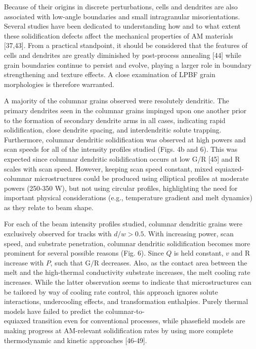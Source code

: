 \documentclass[10pt]{article}
\begin{document}
Because of their origins in discrete perturbations, cells and dendrites are also associated with low-angle boundaries and small intragranular misorientations. Several studies have been dedicated to understanding how and to what extent these solidification defects affect the mechanical properties of AM materials [37,43]. From a practical standpoint, it should be considered that the features of cells and dendrites are greatly diminished by post-process annealing [44] while grain boundaries continue to persist and evolve, playing a larger role in boundary strengthening and texture effects. A close examination of LPBF grain morphologies is therefore warranted.

A majority of the columnar grains observed were resolutely dendritic. The primary dendrites seen in the columnar grains impinged upon one another prior to the formation of secondary dendrite arms in all cases, indicating rapid solidification, close dendrite spacing, and interdendritic solute trapping. Furthermore, columnar dendritic solidification was observed at high powers and scan speeds for all of the intensity profiles studied (Figs. 4b and 6). This was expected since columnar dendritic solidification occurs at low G/R [45] and R scales with scan speed. However, keeping scan speed constant, mixed equiaxed-columnar microstructures could be produced using elliptical profiles at moderate powers (250-350 W), but not using circular profiles, highlighting the need for important physical considerations (e.g., temperature gradient and melt dynamics) as they relate to beam shape.

For each of the beam intensity profiles studied, columnar dendritic grains were exclusively observed for tracks with $d / w>0.5$. With increasing power, scan speed, and substrate penetration, columnar dendritic solidification becomes more prominent for several possible reasons (Fig. 6). Since $Q$ is held constant, $v$ and $\mathrm{R}$ increase with $P$, such that $\mathrm{G} / \mathrm{R}$ decreases. Also, as the contact area between the melt and the high-thermal conductivity substrate increases, the melt cooling rate increases. While the latter observation seems to indicate that microstructures can be tailored by way of cooling rate control, this approach ignores solute interactions, undercooling effects, and transformation enthalpies. Purely thermal models have failed to predict the columnar-to-\\
equiaxed transition even for conventional processes, while phasefield models are making progress at AM-relevant solidification rates by using more complete thermodynamic and kinetic approaches [46-49].
\end{document}
